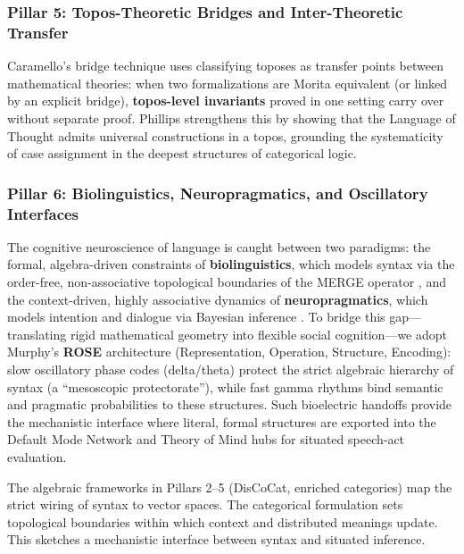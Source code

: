 \documentclass[
]{article}
\begin{document}
\subsubsection{Pillar 5: Topos-Theoretic Bridges and Inter-Theoretic
Transfer}\label{pillar-5-topos-theoretic-bridges-and-inter-theoretic-transfer}

Caramello's
\citetext{\citeyear{caramello2016bridges}; \citeyear{caramello2021five}; \citeyear{caramello2023syntactic}}
bridge technique uses classifying toposes as transfer points between
mathematical theories: when two formalizations are Morita equivalent (or
linked by an explicit bridge), \textbf{topos-level invariants} proved in
one setting carry over without separate proof. Phillips
\citeyearpar{phillips2024lot} strengthens this by showing that the
Language of Thought admits universal constructions in a topos, grounding
the systematicity of case assignment in the deepest structures of
categorical logic.

\subsubsection{Pillar 6: Biolinguistics, Neuropragmatics, and
Oscillatory
Interfaces}\label{pillar-6-biolinguistics-neuropragmatics-and-oscillatory-interfaces}

The cognitive neuroscience of language is caught between two paradigms:
the formal, algebra-driven constraints of \textbf{biolinguistics}, which
models syntax via the order-free, non-associative topological boundaries
of the MERGE operator \citep{murphy2026frege}, and the context-driven,
highly associative dynamics of \textbf{neuropragmatics}, which models
intention and dialogue via Bayesian inference
\citep{gutierrez2026neuropragmatics}. To bridge this gap---translating
rigid mathematical geometry into flexible social cognition---we adopt
Murphy's \textbf{ROSE} architecture \citep{murphy2023rose}
(Representation, Operation, Structure, Encoding): slow oscillatory phase
codes (delta/theta) protect the strict algebraic hierarchy of syntax (a
``mesoscopic protectorate''), while fast gamma rhythms bind semantic and
pragmatic probabilities to these structures. Such bioelectric handoffs
provide the mechanistic interface where literal, formal structures are
exported into the Default Mode Network and Theory of Mind hubs for
situated speech-act evaluation.

The algebraic frameworks in Pillars 2--5 (DisCoCat, enriched categories)
map the strict wiring of syntax to vector spaces. The categorical
formulation sets topological boundaries within which context and
distributed meanings update. This sketches a mechanistic interface
between syntax and situated inference.
\end{document}
